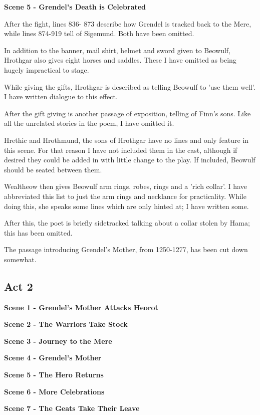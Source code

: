 \documentclass[a4paper]{article}
\begin{document}
{\centerline{\textbf{Scene 5 - Grendel's Death is Celebrated}}

After the fight, lines 836- 873 describe how Grendel is tracked back to the Mere, while
lines 874-919 tell of Sigemund. Both have been omitted.

In addition to the banner, mail shirt, helmet and sword given to Beowulf,
Hrothgar also gives eight horses and saddles. These I have omitted as being
hugely impractical to stage.

While giving the gifts, Hrothgar is described as telling Beowulf to 'use them well'.
I have written dialogue to this effect.

After the gift giving is another passage of exposition, telling of Finn's sons.
Like all the unrelated stories in the poem, I have omitted it.

Hrethic and Hrothmund, the sons of Hrothgar have no lines and only feature in this scene.
For that reason I have not included them in the cast, although if desired they 
could be added in with little change to the play. If included, Beowulf should
be seated between them.

Wealtheow then gives Beowulf arm rings, robes, rings and a 'rich collar'. I
have abbreviated this list to just the arm rings and necklance for practicality. 
While doing this, she speaks some lines which are only hinted at; I have written some.

After this, the poet is briefly sidetracked talking about a collar stolen by Hama;
this has been omitted.

The passage introducing Grendel's Mother, from 1250-1277, has been cut down somewhat.

\subsection{Act 2}%

\centerline{\textbf{Scene 1 - Grendel's Mother Attacks Heorot}}

\centerline{\textbf{Scene 2 - The Warriors Take Stock}}

\centerline{\textbf{Scene 3 - Journey to the Mere}}

\centerline{\textbf{Scene 4 - Grendel's Mother}}

\centerline{\textbf{Scene 5 - The Hero Returns}}

\centerline{\textbf{Scene 6 - More Celebrations}}

\centerline{\textbf{Scene 7 - The Geats Take Their Leave}}

}
\end{document}
